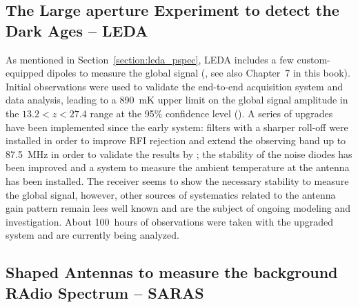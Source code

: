 \subsection{The Large aperture Experiment to detect the Dark Ages -- LEDA}
\label{leda_global}
As mentioned in Section~\ref{section:leda_pspec}, LEDA includes a few custom-equipped dipoles to measure the global signal (\cite{price18}, see also Chapter~7 in this book). Initial observations were used to validate the end-to-end acquisition system and data analysis, leading to a 890~mK upper limit on the global signal amplitude in the $13.2 < z < 27.4$ range at the 95\% confidence level (\cite{bernardi16}). A series of upgrades have been implemented since the early system: filters with a sharper roll-off were installed in order to improve RFI rejection and extend the observing band up to 87.5~MHz in order to validate the results by \cite{bowman18}; the stability of the noise diodes has been improved and a system to measure the ambient temperature at the antenna has been installed. The receiver seems to show the necessary stability to measure the global signal, however, other sources of systematics related to the antenna gain pattern remain lees well known and are the subject of ongoing modeling and investigation.
%
About 100~hours of observations were taken with the upgraded system and are currently being analyzed.
%


\subsection{Shaped Antennas to measure the background RAdio Spectrum -- SARAS}

